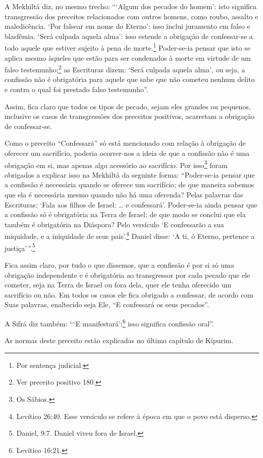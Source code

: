 A Mekhiltá diz, no mesmo trecho: ```Algum dos pecados do homem': isto
significa transgressão dos preceitos relacionados com outros homens,
como roubo, assalto e maledicência. `Por falsear em nome do Eterno':
isso inclui juramento em falso e blasfêmia. `Será culpada aquela alma': isso estende a obrigação de confessar-se a todo aquele que estiver
sujeito à pena de morte.\footnote{Por sentença judicial.} Poder-se-ia pensar que
isto se aplica mesmo àqueles que estão para ser condenados à morte em
virtude de um falso testemunho;\footnote{Ver preceito positivo 180.} as Escrituras
dizem: `Será culpada aquela alma', ou seja, a confissão não é obrigatória para
aquele que sabe que não cometeu nenhum delito e contra o qual foi prestado falso
testemunho''.

Assim, fica claro que todos os tipos de pecado, sejam eles grandes ou
pequenos, inclusive os casos de transgressões dos preceitos positivos,
acarretam a obrigação de confessar-se.

Como o preceito ``Confessará'' só está mencionado com relação à
obrigação de oferecer um sacrifício, poderia ocorrer-nos a ideia de que
a confissão não é uma obrigação em si, mas apenas algo acessório ao
sacrifício. Por isso\footnote{Os Sábios.} foram obrigados a explicar
isso na Mekhiltá da seguinte forma: ``Poder-se-ia pensar que a
confissão é necessária quando se oferece um sacrifício; de
que maneira sabemos que ela é necessária mesmo quando não há uma
oferenda? Pelas palavras das Escrituras: `Fala aos filhos de Israel: \ldots{} e confessará'. Poder-se-ia ainda pensar que a confissão só é
obrigatória na Terra de Israel; de que modo se conclui que ela também é
obrigatória na Diáspora? Pelo versículo `E confessarão a sua iniquidade, e a iniquidade de seus pais'.\footnote{Levítico 26:40. Esse versículo se refere à época em que o povo está disperso.} Daniel disse: `A ti, ó Eterno, pertence a justiça'\,''.\footnote{Daniel, 9:7. Daniel viveu fora de Israel.}

Fica assim claro, por tudo o que dissemos, que a confissão é por si
só uma obrigação independente e é obrigatória ao transgressor por cada
pecado que ele cometer, seja na Terra de Israel ou fora dela, quer ele
tenha oferecido um sacrifício ou não. Em todos os casos ele fica
obrigado a confessar, de acordo com Suas palavras, enaltecido seja Ele,
``E confessará os seus pecados''.

A Sifrá diz também: ```E manifestará':\footnote{Levítico 16:21.} isso significa confissão oral''.

As normas deste preceito estão explicadas no último capítulo de Kipurim.

